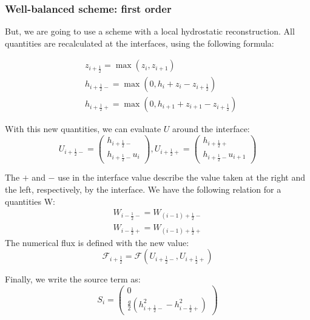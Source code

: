         \subsubsection{Well-balanced scheme: first order}
        But, we are going to use a scheme with a local hydrostatic reconstruction. All quantities are recalculated at the interfaces, using the following formula:
        
        \begin{align*}
            &z_{i+\frac{1}{2}}=\max(z_i, z_{i+1}) \\
            &h_{i+\frac{1}{2}-} = \max(0, h_i+z_i - z_{i+\frac{1}{2}}) \\
            &h_{i+\frac{1}{2}+} = \max(0, h_{i+1}+z_{i+1} -z_{i+\frac{1}{2}}) 
        \end{align*}

        With this new quantities, we can evaluate $U$ around the interface:
        \begin{equation*}
            U_{i+\frac{1}{2}-} =\begin{pmatrix} h_{i+\frac{1}{2}-} \\ h_{i+\frac{1}{2}-}u_i\end{pmatrix} ,U_{i+\frac{1}{2}+} =\begin{pmatrix} h_{i+\frac{1}{2}+} \\ h_{i+\frac{1}{2}-}u_{i+1}\end{pmatrix}
        \end{equation*}
        
        The $+$ and $-$ use in the interface value describe the value taken at the right and the left, respectively, by the interface.
        We have the following relation for a quantities W:
        \begin{align*}
            W_{i-\frac{1}{2}-}=W_{(i-1)+\frac{1}{2}-} \\
            W_{i-\frac{1}{2}+}=W_{(i-1)+\frac{1}{2}+}
        \end{align*}
        The numerical flux is defined with the new value:
        \begin{equation*}
            \mathcal{F}_{i+\frac{1}{2}}= \mathcal{F}(U_{i+\frac{1}{2}-},U_{i+\frac{1}{2}+})
        \end{equation*}
        
        Finally, we write the source term as:
        \begin{equation*}
            S_i = \begin{pmatrix} 0 \\ \frac{g}{2}\left(  h^2_{i+\frac{1}{2}-} - h^2_{i-\frac{1}{2}+} \right)\end{pmatrix}
        \end{equation*}
        
